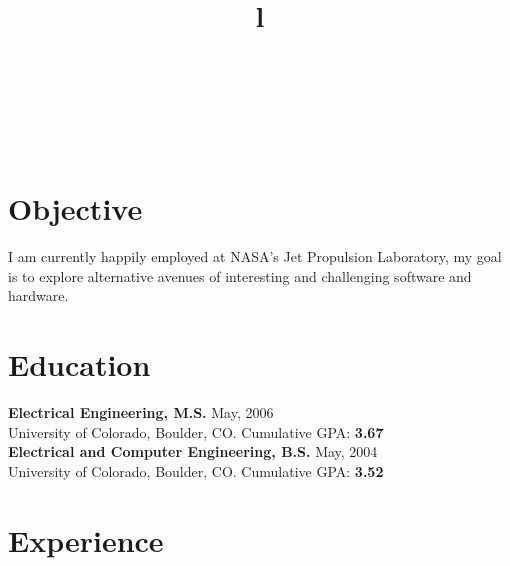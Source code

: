 \begin{resume}

\begin{format}
\title{l}\\
\\
\body\\
\end{format}

\section{\sc Objective}
I am currently happily employed at NASA's Jet Propulsion Laboratory, my goal is to explore alternative avenues of interesting and challenging software and hardware.
\section{\sc Education}
{\bf Electrical Engineering, M.S.} May, 2006\\
University of Colorado, Boulder, CO. \newline
Cumulative GPA: {\bf 3.67} \\

{\bf Electrical and Computer Engineering, B.S.} May, 2004\\
University of Colorado, Boulder, CO. \newline
Cumulative GPA: {\bf 3.52}\\
\section{\sc Experience}


\end{resume}
